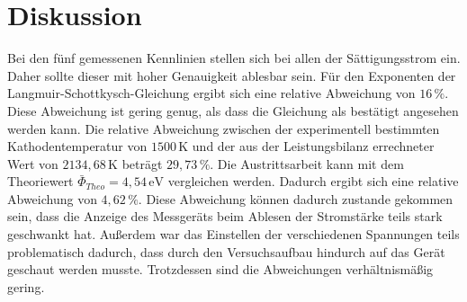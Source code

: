 \section{Diskussion}
\label{sec:Diskussion}
Bei den fünf gemessenen Kennlinien stellen sich bei allen der 
Sättigungsstrom ein. Daher sollte dieser mit hoher Genauigkeit ablesbar sein. 
Für den Exponenten der Langmuir-Schottkysch-Gleichung ergibt sich eine relative Abweichung von 
$16 \, \%$. Diese Abweichung ist gering genug, als dass die Gleichung als bestätigt angesehen werden kann.
Die relative Abweichung zwischen der experimentell bestimmten Kathodentemperatur von $1500 \, \unit{\kelvin}$ 
und der aus der Leistungsbilanz errechneter Wert von $2134,68 \, \unit{\kelvin}$ beträgt $29,73 \, \%$.
Die Austrittsarbeit kann mit dem Theoriewert $\bar{\Phi}_{Theo} = 4,54 \, \unit{\eV}$ vergleichen werden. 
Dadurch ergibt sich eine relative Abweichung von $ 4,62 \, \%$. 
Diese Abweichung können dadurch zustande gekommen sein, dass die Anzeige des Messgeräts beim Ablesen der Stromstärke 
teils stark geschwankt hat. Außerdem war das Einstellen der verschiedenen Spannungen teils 
problematisch dadurch, dass durch den Versuchsaufbau hindurch auf das Gerät geschaut werden musste. 
Trotzdessen sind die Abweichungen verhältnismäßig gering. 